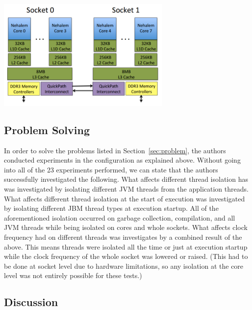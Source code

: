 \documentclass[conference]{IEEEtran}
\begin{document}
\begin{center}
\includegraphics[height=55mm]{images/hardware}
\end{center}

\subsection{Problem Solving}

In order to solve the problems listed in Section~\ref{sec:problem}, the authors
conducted experiments in the configuration as explained above. Without going into all of the 23
experiments performed, we can state that the authors successfully investigated the following.
What affects different thread isolation has was investigated by isolating different JVM threads
from the application threads. What affects different thread isolation at the start of execution
was investigated by isolating different JBM thread types at execution startup. All of the
aforementioned isolation occurred on garbage collection, compilation, and all JVM threads
while being isolated on cores and whole sockets. What affects clock frequency had on different
threads was investigates by a combined result of the above. This means threads were isolated all
the time or just at execution startup while the clock frequency of the whole socket was lowered
or raised. (This had to be done at socket level due to hardware limitations, so any isolation
at the core level was not entirely possible for these tests.) 

\subsection {Discussion}
\end{document}
